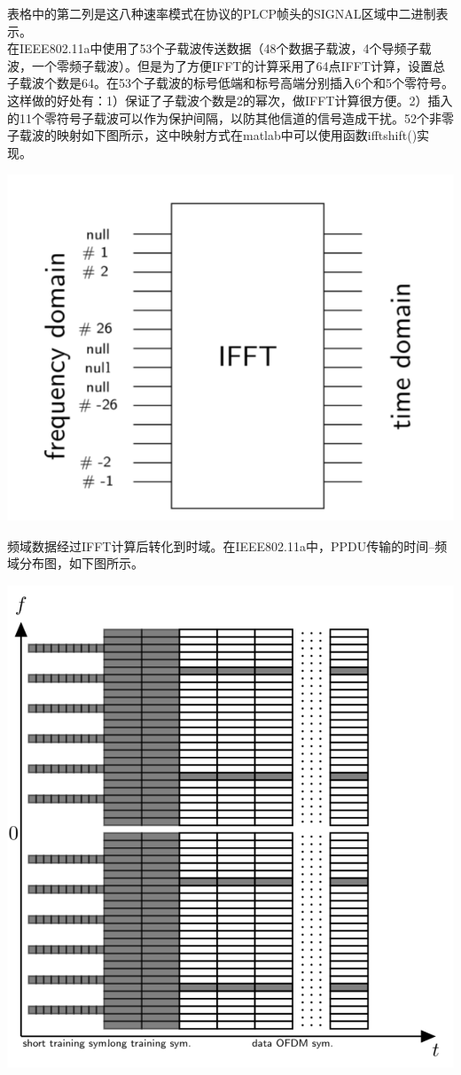 \documentclass[10pt,a4paper,UTF8]{article}
\begin{document}
表格中的第二列是这八种速率模式在协议的PLCP帧头的SIGNAL区域中二进制表示。\\

在IEEE802.11a中使用了53个子载波传送数据（48个数据子载波，4个导频子载波，一个零频子载波）。但是为了方便IFFT的计算采用了64点IFFT计算，设置总子载波个数是64。在53个子载波的标号低端和标号高端分别插入6个和5个零符号。这样做的好处有：1）保证了子载波个数是2的幂次，做IFFT计算很方便。2）插入的11个零符号子载波可以作为保护间隔，以防其他信道的信号造成干扰。52个非零子载波的映射如下图所示，这中映射方式在matlab中可以使用函数ifftshift()实现。


\begin{center}
\includegraphics[width=.9\linewidth]{../../img/communication_protocol/20171018fft54.png}
\end{center}

频域数据经过IFFT计算后转化到时域。在IEEE802.11a中，PPDU传输的时间--频域分布图，如下图所示。

\begin{center}
\includegraphics[width=.9\linewidth]{../../img/communication_protocol/20171018ppdu.png}
\end{center}
\end{document}
